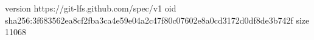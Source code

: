 version https://git-lfs.github.com/spec/v1
oid sha256:3f683562ea8cf2fba3ca4e59e04a2c47f80c07602e8a0cd3172d0df8de3b742f
size 11068
